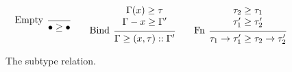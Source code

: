 \documentclass{article}
\theoremstyle{definition}
\newcommand*{\cons}{::}
\begin{document}
\begin{figure}[h!]
  \footnotesize
  \begin{flushright}
    \fbox{$\tau\ge\tau$}
  \end{flushright}
  \centering
  \vspace{0pt} %
  \[
    \begin{prooftree}
      \infer[left label=Empty]0{
      \bullet\ge\bullet
      }
    \end{prooftree}\qquad
    \begin{prooftree}
      \hypo{
        \begin{matrix}
          \Gamma(x)\ge\tau \\
          \Gamma-x\ge\Gamma'
        \end{matrix}
      }
      \infer[left label=Bind]1{
      \Gamma\ge(x,\tau)\cons\Gamma'
      }
    \end{prooftree}\qquad
    \begin{prooftree}
      \hypo{
        \begin{matrix}
          \tau_2\ge\tau_1 \\
          \tau_1'\ge\tau_2'
        \end{matrix}
      }
      \infer[left label=Fn]1{
      \tau_1\rightarrow\tau_1'\ge
      \tau_2\rightarrow\tau_2'
      }
    \end{prooftree}
  \]
  \caption{The subtype relation.}
  \label{fig:subtyping}
\end{figure}
\end{document}
